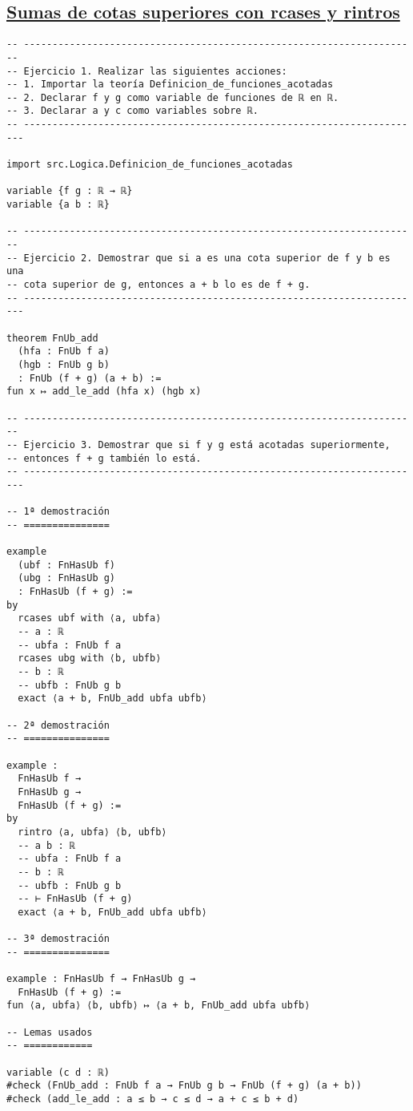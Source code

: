 \subsection{\href{./src/Logica/Sumas\_de\_cotas\_superiores\_con\_rcases\_y\_rintros.lean}{Sumas de cotas superiores con rcases y rintros}}
\label{sec:orgd115c26}
\begin{verbatim}
-- ---------------------------------------------------------------------
-- Ejercicio 1. Realizar las siguientes acciones:
-- 1. Importar la teoría Definicion_de_funciones_acotadas
-- 2. Declarar f y g como variable de funciones de ℝ en ℝ.
-- 3. Declarar a y c como variables sobre ℝ.
-- ----------------------------------------------------------------------

import src.Logica.Definicion_de_funciones_acotadas

variable {f g : ℝ → ℝ}
variable {a b : ℝ}

-- ---------------------------------------------------------------------
-- Ejercicio 2. Demostrar que si a es una cota superior de f y b es una
-- cota superior de g, entonces a + b lo es de f + g.
-- ----------------------------------------------------------------------

theorem FnUb_add
  (hfa : FnUb f a)
  (hgb : FnUb g b)
  : FnUb (f + g) (a + b) :=
fun x ↦ add_le_add (hfa x) (hgb x)

-- ---------------------------------------------------------------------
-- Ejercicio 3. Demostrar que si f y g está acotadas superiormente,
-- entonces f + g también lo está.
-- ----------------------------------------------------------------------

-- 1ª demostración
-- ===============

example
  (ubf : FnHasUb f)
  (ubg : FnHasUb g)
  : FnHasUb (f + g) :=
by
  rcases ubf with ⟨a, ubfa⟩
  -- a : ℝ
  -- ubfa : FnUb f a
  rcases ubg with ⟨b, ubfb⟩
  -- b : ℝ
  -- ubfb : FnUb g b
  exact ⟨a + b, FnUb_add ubfa ubfb⟩

-- 2ª demostración
-- ===============

example :
  FnHasUb f →
  FnHasUb g →
  FnHasUb (f + g) :=
by
  rintro ⟨a, ubfa⟩ ⟨b, ubfb⟩
  -- a b : ℝ
  -- ubfa : FnUb f a
  -- b : ℝ
  -- ubfb : FnUb g b
  -- ⊢ FnHasUb (f + g)
  exact ⟨a + b, FnUb_add ubfa ubfb⟩

-- 3ª demostración
-- ===============

example : FnHasUb f → FnHasUb g →
  FnHasUb (f + g) :=
fun ⟨a, ubfa⟩ ⟨b, ubfb⟩ ↦ ⟨a + b, FnUb_add ubfa ubfb⟩

-- Lemas usados
-- ============

variable (c d : ℝ)
#check (FnUb_add : FnUb f a → FnUb g b → FnUb (f + g) (a + b))
#check (add_le_add : a ≤ b → c ≤ d → a + c ≤ b + d)
\end{verbatim}

